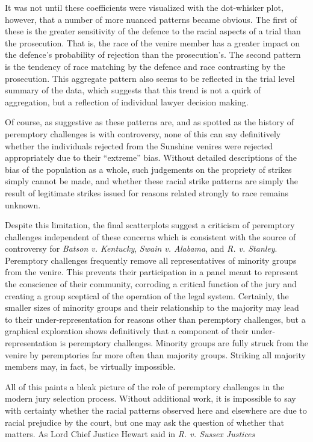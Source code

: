 It was not until these coefficients were visualized with the dot-whisker plot, however, that a number of more nuanced patterns
became obvious. The first of these is the greater sensitivity of the
defence to the racial aspects of a trial than the
prosecution. That is, the race of the venire member has a greater impact on the defence's probability of rejection than the
prosecution's. The second pattern is the tendency of race matching by
the defence and race contrasting by the prosecution. This aggregate pattern also seems to be reflected in the trial level
summary of the data, which suggests that this trend is not a quirk of
aggregation, but a reflection of individual lawyer decision making.

Of course, as suggestive as these patterns are, and as spotted as the history of peremptory challenges is with controversy, none
of this can say definitively whether the individuals rejected from the
Sunshine venires were rejected appropriately due to their ``extreme''
bias. Without detailed descriptions of the bias of the population as a whole, such judgements on the propriety of strikes simply
cannot be made, and whether these racial strike patterns are simply the result of legitimate strikes issued for reasons related
strongly to race remains unknown.

Despite this limitation, the final scatterplots suggest a criticism of
peremptory challenges independent of these concerns which is consistent with the source
of controversy for \textit{Batson v. Kentucky}, \textit{Swain v. Alabama}, and \textit{R. v. Stanley}. Peremptory challenges
frequently remove all representatives of minority groups from the
venire. This prevents their participation in a panel meant to
represent the conscience of their community, corroding a critical function of the jury and creating a group
sceptical of the operation of the legal system. Certainly, the smaller sizes of minority groups and their relationship to the
majority may lead to their under-representation for reasons other than peremptory challenges, but a graphical exploration shows
definitively that a component of their under-representation is
peremptory challenges. Minority groups are fully struck from the
venire by peremptories far more often than majority groups. Striking
all majority members may, in fact, be virtually impossible.

All of this paints a bleak picture of the role of peremptory challenges in the modern jury selection process. Without additional
work, it is impossible to say with certainty whether the racial patterns observed here and elsewhere are due to racial prejudice
by the court, but one may ask the question of whether that matters. As Lord Chief Justice Hewart said in \textit{R. v. Sussex
  Justices}

